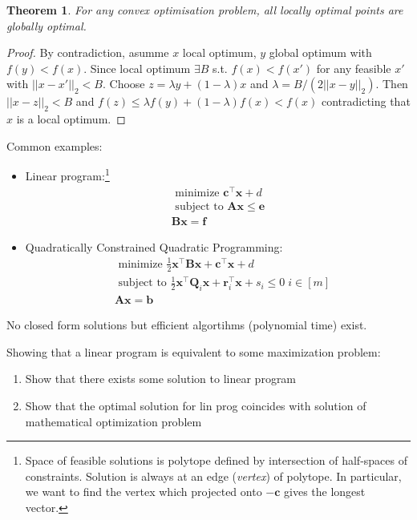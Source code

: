 \documentclass[11pt, %
	oneside, %
	english, %
	onehalfspacing, %
	parskip, %
	]{article} %
\newtheorem{theorem}{Theorem}
\theoremstyle{definition}
\begin{document}
\begin{theorem}
	For any convex optimisation problem, all locally optimal points are globally optimal.
\end{theorem}

\begin{proof}
	By contradiction, asumme $x$ local optimum, $y$ global optimum with $f(y) < f(x)$. Since local optimum $\exists B$ s.t. $f(x) < f(x')$ for any feasible $x'$ with $||x-x'||_2 < B$. Choose $z = \lambda y + (1-\lambda) x$ and $\lambda = B /(2 ||x-y||_2)$. Then $||x-z||_2 < B$ and $f(z) \leq \lambda f(y) + (1-\lambda) f(x) < f(x)$ contradicting that $x$ is a local optimum.
\end{proof}

Common examples:
\begin{itemize}
	\item Linear program:\footnote{Space of feasible solutions is polytope defined by intersection of half-spaces of constraints. Solution is always at an edge (\emph{vertex}) of polytope. In particular, we want to find the vertex which projected onto $-\mathbf{c}$ gives the longest vector.}
	\begin{equation*}
		\begin{array}{r}
			\text { minimize } \mathbf{c}^{\top} \mathbf{x}+d \\
			\text { subject to } \mathbf{A} \mathbf{x} \leq \mathbf{e} \\
			\mathbf{B} \mathbf{x}=\mathbf{f}
		\end{array}
	\end{equation*}
	\item Quadratically Constrained Quadratic Programming:
	\begin{equation*}
		\begin{aligned}
			& \text { minimize } \frac{1}{2} \mathbf{x}^{\top} \mathbf{B} \mathbf{x}+\mathbf{c}^{\top} \mathbf{x}+d \\
			& \text { subject to } \frac{1}{2} \mathbf{x}^{\top} \mathbf{Q}_i \mathbf{x}+\mathbf{r}_i^{\top} \mathbf{x}+s_i \leq 0 \; i \in[m] \\
			& \mathbf{A} \mathbf{x}=\mathbf{b}
		\end{aligned}
	\end{equation*}
\end{itemize}
No closed form solutions but efficient algortihms (polynomial time) exist.

Showing that a linear program is equivalent to some maximization problem:
\begin{enumerate}
	\item Show that there exists some solution to linear program
	\item Show that the optimal solution for lin prog coincides with solution of mathematical optimization problem
\end{enumerate}
\end{document}
